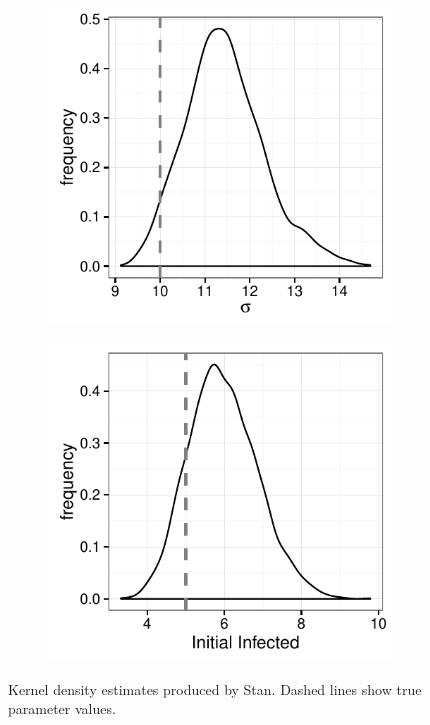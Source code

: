 \begin{figure}
\begin{subfigure}[tr]{0.4\textwidth}
        \end{subfigure}
        \begin{subfigure}[bl]{0.4\textwidth}
            \includegraphics[width=\textwidth]{./images/kernelsigma.pdf}
        \end{subfigure}
        \begin{subfigure}[br]{0.4\textwidth}
            \includegraphics[width=\textwidth]{./images/kernelinfec.pdf}
        \end{subfigure}
        \caption{Kernel density estimates produced by Stan. Dashed lines show true parameter values. \label{hmckernels}}
    \end{figure}
